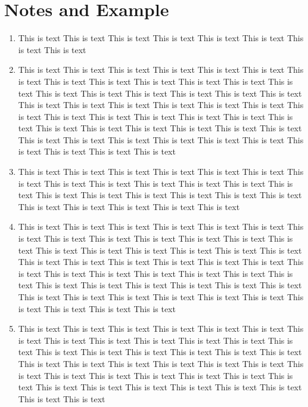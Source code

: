 \documentclass[a4paper]{uestcreport}
\begin{document}
\section{Notes and Example}
\begin{enumerate}
    \item This is text This is text This is text This is text This is text This is text This is text This is text 
    \item This is text This is text This is text This is text This is text This is text This is text This is text This is text This is text This is text This is text This is text This is text This is text This is text This is text This is text This is text This is text This is text This is text This is text This is text This is text This is text This is text This is text This is text This is text This is text This is text This is text This is text This is text This is text This is text This is text This is text This is text This is text This is text This is text This is text This is text This is text This is text This is text 
    \item This is text This is text This is text This is text This is text This is text This is text This is text This is text This is text This is text This is text This is text This is text This is text This is text This is text This is text This is text This is text This is text This is text This is text This is text 
    \item This is text This is text This is text This is text This is text This is text This is text This is text This is text This is text This is text This is text This is text This is text This is text This is text This is text This is text This is text This is text This is text This is text This is text This is text This is text This is text This is text This is text This is text This is text This is text This is text This is text This is text This is text This is text This is text This is text This is text This is text This is text This is text This is text This is text This is text This is text This is text This is text 
    \item This is text This is text This is text This is text This is text This is text This is text This is text This is text This is text This is text This is text This is text This is text This is text This is text This is text This is text This is text This is text This is text This is text This is text This is text This is text This is text This is text This is text This is text This is text This is text This is text This is text This is text This is text This is text This is text This is text This is text This is text 


\end{enumerate}
\end{document}
